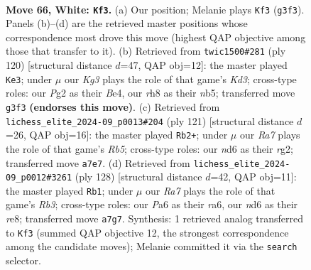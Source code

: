 \documentclass[11pt]{article}
\begin{document}
\clearpage

\begin{figure}[p]\centering
\begin{subfigure}{0.46\textwidth}\centering
\resizebox{\linewidth}{!}{%
\newchessgame
\chessboard[
  setfen={3k3r/R6p/P2n4/8/2P5/2p3KP/2P3P1/5B2 w - - 1 66},
  showmover=false,
  pgfstyle=straightmove, color=movearrow, markmove={g3-f3}
]}
\caption{}
\end{subfigure}\hfill
\begin{subfigure}{0.46\textwidth}\centering
\resizebox{\linewidth}{!}{%
\newchessgame
\chessboard[
  setfen={3k4/6R1/5p1p/1nrP3P/4B1P1/3K1P2/1p6/8 w - - 0 61},
  showmover=false,
  pgfstyle=straightmove, color=movearrow, markmove={d3-e3}
]}
\caption{}
\end{subfigure}
\\[4pt]
\begin{subfigure}{0.46\textwidth}\centering
\resizebox{\linewidth}{!}{%
\newchessgame
\chessboard[
  setfen={8/8/1k3p1p/1p2bP1P/1r2p3/6p1/2K1N1R1/8 b - - 1 61},
  showmover=false,
  pgfstyle=straightmove, color=movearrow, markmove={b4-b2}
]}
\caption{}
\end{subfigure}\hfill
\begin{subfigure}{0.46\textwidth}\centering
\resizebox{\linewidth}{!}{%
\newchessgame
\chessboard[
  setfen={4r1k1/5p2/r6p/8/4P3/1R3B1P/6PK/8 w - - 44 65},
  showmover=false,
  pgfstyle=straightmove, color=movearrow, markmove={b3-b1}
]}
\caption{}
\end{subfigure}
\caption{\textbf{Move 66, White: \texttt{Kf3}.} (a) Our position; Melanie plays \texttt{Kf3} (\texttt{g3f3}). Panels (b)--(d) are the retrieved master positions whose correspondence most drove this move (highest QAP objective among those that transfer to it). (b) Retrieved from \texttt{twic1500\#281} (ply 120) [structural distance $d$=47, QAP obj=12]: the master played \texttt{Ke3}; under $\mu$ our \emph{Kg3} plays the role of that game's \emph{Kd3}; cross-type roles: our \emph{P}g2 as their \emph{B}e4, our \emph{r}h8 as their \emph{n}b5; transferred move \texttt{g3f3} \textbf{(endorses this move)}. (c) Retrieved from \texttt{lichess\_elite\_2024-09\_p0013\#204} (ply 121) [structural distance $d$=26, QAP obj=16]: the master played \texttt{Rb2+}; under $\mu$ our \emph{Ra7} plays the role of that game's \emph{Rb5}; cross-type roles: our \emph{n}d6 as their \emph{r}g2; transferred move \texttt{a7e7}. (d) Retrieved from \texttt{lichess\_elite\_2024-09\_p0012\#3261} (ply 128) [structural distance $d$=42, QAP obj=11]: the master played \texttt{Rb1}; under $\mu$ our \emph{Ra7} plays the role of that game's \emph{Rb3}; cross-type roles: our \emph{P}a6 as their \emph{r}a6, our \emph{n}d6 as their \emph{r}e8; transferred move \texttt{a7g7}. Synthesis: 1 retrieved analog transferred to \texttt{Kf3} (summed QAP objective 12, the strongest correspondence among the candidate moves); Melanie committed it via the \texttt{search} selector.}
\label{fig:thought-m130}
\end{figure}
\end{document}
